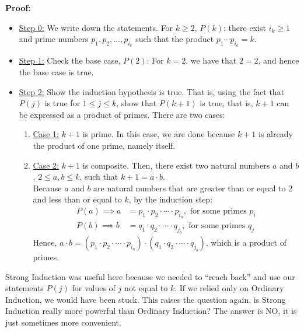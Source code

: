 \textbf{Proof:} 

    \begin{itemize}
    \item \underline{Step 0:} We write down the statements. For $k \ge 2$, $P(k)$: there exist $i_k \ge 1$ and prime numbers $p_1, p_2, \ldots, p_{i_k}$ such that the product  $p_1 \dotsb p_{i_k} = k$. 
        \item \underline{Step 1:} Check the base case, $P(2)$: For  $k=2$, we have that $ 2 = 2$, and hence the base case is true. 
        \item \underline{Step 2:} Show the induction hypothesis is true. That is, using the fact that $P(j)$ is true for $1 \le j \le k$, show that $P(k+1)$ is true, that is, $k+1$ can be expressed as a product of primes. 
         There are two cases:
    \begin{enumerate}
    \renewcommand{\labelenumi}{(\alph{enumi})}
        \setlength{\itemsep}{.1cm}
        \item \underline{Case 1:} $k+1$ is prime. In this case, we are done because $k+1$ is already the product of one prime, namely itself.
        \item \underline{Case 2:} $k+1$ is composite. Then, there exist two natural numbers $a$ and $b$, $2\le a, b \le k$, such that $k+1 = a \cdot b$. \\
        
         Because $a$ and $b$ are natural numbers that are greater than or equal to $2$ and less than or equal to $k$, by the induction step:
    \begin{align*}
   P(a) \implies      a &= p_1 \cdot p_2 \cdot \dotsb \cdot p_{i_a}, \text{ for some primes } p_i\\
   P(b) \implies      b &= q_1 \cdot q_2 \cdot \dotsb \cdot q_{j_b}, \text{ for some primes } q_j
    \end{align*}
Hence, $a\cdot b = (p_1 \cdot p_2 \cdot \dotsb \cdot p_{i_a})\cdot (q_1 \cdot q_2 \cdot \dotsb \cdot q_{j_b})$, which is a product of primes.
    \end{enumerate}
    \end{itemize}
    
\Qed   

\vspace*{.2cm}

Strong Induction was useful here because we needed to ``reach back'' and use our statements $P(j)$ for values of $j$ not equal to $k$. If we relied only on Ordinary Induction, we would have been stuck. This raises the question again, is Strong Induction really more powerful than Ordinary Induction? The answer is NO, it is just sometimes more convenient. \\

